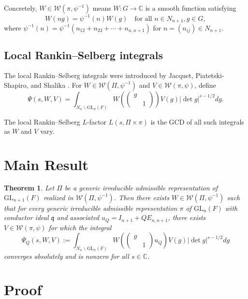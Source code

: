\documentclass[12pt]{article}
\newtheorem{theorem}{Theorem}
\begin{document}
Concretely, $W \in \mathcal{W}(\pi, \psi^{-1})$ means $W: G \to \mathbb{C}$ is a smooth function satisfying
\[
W(ng) = \psi^{-1}(n) W(g) \quad \text{for all } n \in N_{n+1}, g \in G,
\]
where $\psi^{-1}(n) = \psi^{-1}(n_{12} + n_{23} + \cdots + n_{n,n+1})$ for $n = (n_{ij}) \in N_{n+1}$.

\subsection{Local Rankin--Selberg integrals}

The local Rankin--Selberg integrals were introduced by Jacquet, Piatetski-Shapiro, and Shalika \cite{JPSS1983}. For $W \in \mathcal{W}(\Pi, \psi^{-1})$ and $V \in \mathcal{W}(\pi, \psi)$, define
\[
\Psi(s, W, V) = \int_{N_n \backslash \mathrm{GL}_n(F)} W\!\left(\begin{pmatrix} g & \\ & 1 \end{pmatrix}\right) V(g) |\det g|^{s - 1/2} dg.
\]

The local Rankin--Selberg $L$-factor $L(s, \Pi \times \pi)$ is the GCD of all such integrals as $W$ and $V$ vary.

\section{Main Result}

\begin{theorem}\label{thm:main}
Let $\Pi$ be a generic irreducible admissible representation of $\mathrm{GL}_{n+1}(F)$ realized in $\mathcal{W}(\Pi, \psi^{-1})$. Then there exists $W \in \mathcal{W}(\Pi, \psi^{-1})$ such that for every generic irreducible admissible representation $\pi$ of $\mathrm{GL}_n(F)$ with conductor ideal $\mathfrak{q}$ and associated $u_Q = I_{n+1} + QE_{n,n+1}$, there exists $V \in \mathcal{W}(\pi, \psi)$ for which the integral
\[
\Psi_Q(s, W, V) := \int_{N_n \backslash \mathrm{GL}_n(F)} W\!\left(\begin{pmatrix} g & \\ & 1 \end{pmatrix} u_Q\right) V(g) |\det g|^{s-1/2} dg
\]
converges absolutely and is nonzero for all $s \in \mathbb{C}$.
\end{theorem}

\section{Proof}
\end{document}
